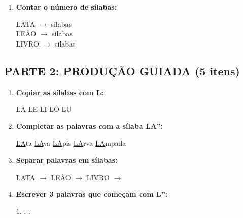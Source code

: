 \begin{exercicio}
\begin{enumerate}
  \item \textbf{Contar o número de sílabas:}
  \begin{center}
  LATA $\rightarrow$ \underline{\hspace{1cm}} sílabas \\
  LEÃO $\rightarrow$ \underline{\hspace{1cm}} sílabas \\
  LIVRO $\rightarrow$ \underline{\hspace{1cm}} sílabas
  \end{center}
\end{enumerate}

\subsection*{PARTE 2: PRODUÇÃO GUIADA (5 itens)}

\begin{enumerate}[resume]
  \item \textbf{Copiar as sílabas com L:}
  \begin{center}
  LA \quad \underline{\hspace{1.5cm}} \quad LE \quad \underline{\hspace{1.5cm}} \quad LI \quad \underline{\hspace{1.5cm}} \quad LO \quad \underline{\hspace{1.5cm}} \quad LU \quad \underline{\hspace{1.5cm}}
  \end{center}

  \item \textbf{Completar as palavras com a sílaba LA'':}
  \begin{center}
  \underline{LA}ta \quad \underline{LA}va \quad \underline{LA}pis \quad \underline{LA}rva \quad \underline{LA}mpada
  \end{center}

  \item \textbf{Separar palavras em sílabas:}
  \begin{center}
  LATA $\rightarrow$ \underline{\hspace{1.5cm}} \quad LEÃO $\rightarrow$ \underline{\hspace{1.5cm}} \quad LIVRO $\rightarrow$ \underline{\hspace{1.5cm}}
  \end{center}

  \item \textbf{Escrever 3 palavras que começam com L'':}
  \begin{center}
  1. \underline{\hspace{3cm}} . \underline{\hspace{3cm}} . \underline{\hspace{3cm}}
  \end{center}


\end{enumerate}
\end{exercicio}
